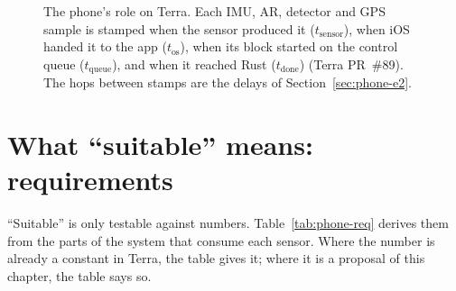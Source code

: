 \begin{figure}[ht]
\caption{The phone's role on Terra. Each IMU, AR, detector and GPS sample is stamped when the sensor produced it ($t_{\text{sensor}}$), when iOS handed it to the app ($t_{\text{os}}$), when its block started on the control queue ($t_{\text{queue}}$), and when it reached Rust ($t_{\text{done}}$) (Terra PR~\#89). The hops between stamps are the delays of Section~\ref{sec:phone-e2}.}
\label{fig:phone-pipeline}
\end{figure}

\section{What ``suitable'' means: requirements}
\label{sec:phone-req}

``Suitable'' is only testable against numbers.
Table~\ref{tab:phone-req} derives them from the parts of the system that consume each sensor.
Where the number is already a constant in Terra, the table gives it; where it is a proposal of this chapter, the table says so.

